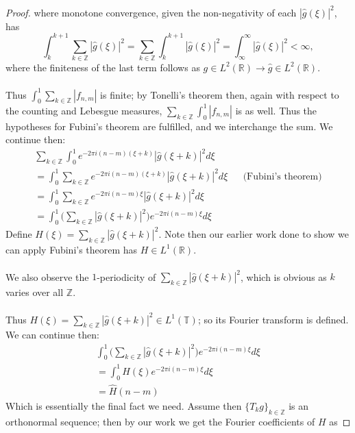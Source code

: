 \documentclass[12pt]{article}
\newenvironment{ex}[2][Exercise]{\begin{trivlist}
\item[\hskip \labelsep {\bfseries #1}\hskip \labelsep {\bfseries #2.}]}{\end{trivlist}}
\begin{document}
\begin{ex}{12}
\begin{proof}
        where monotone convergence, given the non-negativity of each $|\hat{g}(\xi)|^2$, has 
        $$\int_{k}^{k + 1}\sum_{k \in \mathbb{Z}} |\hat{g}(\xi)|^2 = \sum_{k \in \mathbb{Z}} \int_{k}^{k + 1} |\hat{g}(\xi)|^2 = \int_{\infty}^\infty |\hat{g}(\xi)|^2 < \infty,$$
        where the finiteness of the last term follows as $g \in L^2(\mathbb{R}) \rightarrow \hat{g} \in L^2(\mathbb{R})$. \\ \\
        Thus $\int_0^1 \sum_{k \in \mathbb{Z}} |f_{n,m}|$ is finite; by Tonelli's theorem then, again with respect to the counting and Lebesgue measures, $\sum_{k \in \mathbb{Z}} \int_0^1 |f_{n,m}|$ is as well. Thus the hypotheses for Fubini's theorem are fulfilled, and we interchange the sum. We continue then:
        \begin{align*}
            \sum_{k \in \mathbb{Z}} \int_0^1 e^{{-2\pi i}(n - m)(\xi + k)}|\hat{g}(\xi + k)|^2 d\xi \\
            = \int_0^1 \sum_{k \in \mathbb{Z}} e^{{-2\pi i}(n - m)(\xi + k)}|\hat{g}(\xi + k)|^2 d\xi && \text{(Fubini's theorem)} \\
            = \int_0^1 \sum_{k \in \mathbb{Z}} e^{-2\pi i(n - m)\xi}|\hat{g}(\xi + k)|^2 d\xi \\
            = \int_0^1 \Big ( \sum_{k \in \mathbb{Z}} |\hat{g}(\xi + k)|^2 \Big)e^{-2\pi i(n - m)\xi} d\xi
        \end{align*}
        Define $H(\xi) = \sum_{k \in \mathbb{Z}} |\hat{g}(\xi + k)|^2$. Note then our earlier work done to show we can apply Fubini's theorem has $H \in L^1(\mathbb{R})$. \\ \\
        We also observe the $1$-periodicity of $\sum_{k \in \mathbb{Z}} |\hat{g}(\xi + k)|^2$, which is obvious as $k$ varies over all $\mathbb{Z}$. \\ \\
        Thus $H(\xi) = \sum_{k \in \mathbb{Z}} |\hat{g}(\xi + k)|^2 \in L^1(\mathbb{T})$; so its Fourier transform is defined. We can continue then:
        \begin{align*}
            \int_0^1 \Big ( \sum_{k \in \mathbb{Z}} |\hat{g}(\xi + k)|^2 \Big)e^{-2\pi i(n - m)\xi} d\xi \\
            = \int_0^1 H(\xi)e^{-2\pi i(n - m)\xi}d\xi \\
            = \hat{H}(n -m)
        \end{align*}
        Which is essentially the final fact we need. Assume then $\{T_kg\}_{k \in \mathbb{Z}}$ is an orthonormal sequence; then by our work we get the Fourier coefficients of $H$ as 

\end{proof}
\end{ex}
\end{document}
